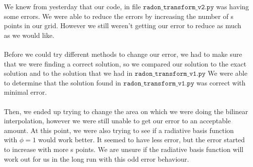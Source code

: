 

 We knew from yesterday that our code, in file $\texttt{radon\_transform\_v2.py}$ was having some errors. We were able to reduce the errors by increasing the number of s points in our grid. However we still weren't getting our error to reduce as much as we would like. \\ \\
 Before we could try different methods to change our error, we had to make sure that we were finding a correct solution, so we compared our solution to the exact solution and to the solution that we had in $\texttt{radon\_transform\_v1.py}$ We were able to determine that the solution found in $\texttt{radon\_transform\_v1.py}$ was correct with minimal error. \\ \\
 Then, we ended up trying to change the area on which we were doing the bilinear interpolation, however we were still unable to get our error to an acceptable amount. At this point, we were also trying to see if a radiative basis function with $\phi = 1$ would work better. It seemed to have less error, but the error started to increase with more s points. We are unsure if the radiative basis function will work out for us in the long run with this odd error behaviour.
